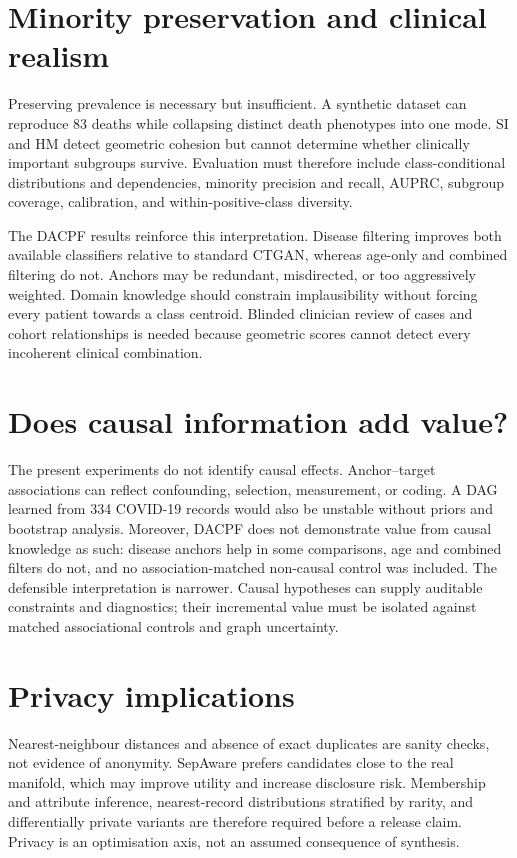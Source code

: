 \section{Minority preservation and clinical realism}

Preserving prevalence is necessary but insufficient. A synthetic dataset can reproduce 83 deaths while collapsing distinct death phenotypes into one mode. SI and HM detect geometric cohesion but cannot determine whether clinically important subgroups survive. Evaluation must therefore include class-conditional distributions and dependencies, minority precision and recall, AUPRC, subgroup coverage, calibration, and within-positive-class diversity.

The DACPF results reinforce this interpretation. Disease filtering improves both available classifiers relative to standard CTGAN, whereas age-only and combined filtering do not. Anchors may be redundant, misdirected, or too aggressively weighted. Domain knowledge should constrain implausibility without forcing every patient towards a class centroid. Blinded clinician review of cases and cohort relationships is needed because geometric scores cannot detect every incoherent clinical combination.

\section{Does causal information add value?}

The present experiments do not identify causal effects. Anchor--target associations can reflect confounding, selection, measurement, or coding. A DAG learned from 334 COVID-19 records would also be unstable without priors and bootstrap analysis. Moreover, DACPF does not demonstrate value from causal knowledge as such: disease anchors help in some comparisons, age and combined filters do not, and no association-matched non-causal control was included. The defensible interpretation is narrower. Causal hypotheses can supply auditable constraints and diagnostics; their incremental value must be isolated against matched associational controls and graph uncertainty.

\section{Privacy implications}

Nearest-neighbour distances and absence of exact duplicates are sanity checks, not evidence of anonymity. SepAware prefers candidates close to the real manifold, which may improve utility and increase disclosure risk. Membership and attribute inference, nearest-record distributions stratified by rarity, and differentially private variants are therefore required before a release claim. Privacy is an optimisation axis, not an assumed consequence of synthesis.

